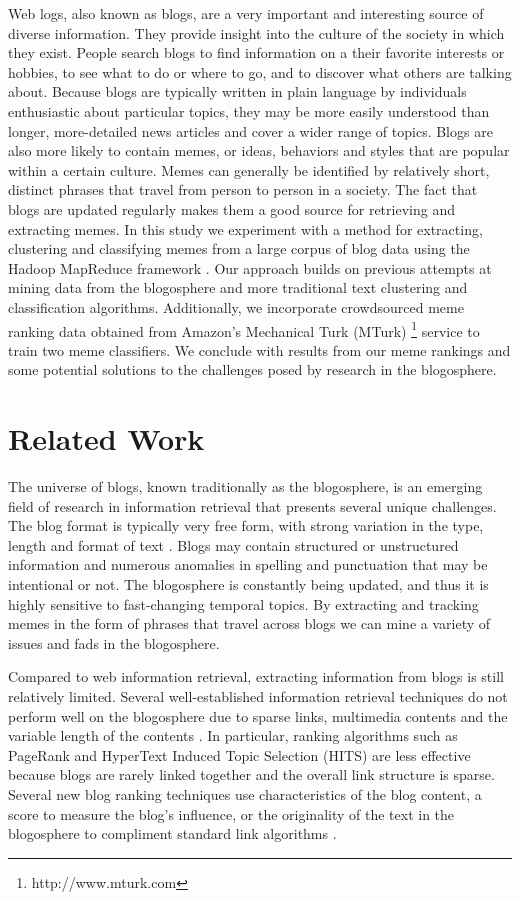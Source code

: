 \documentclass{sig-alternate}
\begin{document}
Web logs, also known as blogs, are a very important and interesting source of diverse information. They provide insight into the culture of the society in which they exist. People search blogs to find information on a their favorite interests or hobbies, to see what to do or where to go, and to discover what others are talking about. Because blogs are typically written in plain language by individuals enthusiastic about particular topics, they may be more easily understood than longer, more-detailed news articles and cover a wider range of topics. Blogs are also more likely to contain memes, or ideas, behaviors and styles that are popular within a certain culture. Memes can generally be identified by relatively short, distinct phrases that travel from person to person in a society. The fact that blogs are updated regularly makes them a good source for retrieving and extracting memes. In this study we experiment with a method for extracting, clustering and classifying memes from a large corpus of blog data using the Hadoop MapReduce framework \cite{Dean2008}. Our approach builds on previous attempts at mining data from the blogosphere and more traditional text clustering and classification algorithms. Additionally, we incorporate crowdsourced meme ranking data obtained from Amazon's Mechanical Turk (MTurk) \footnote{http://www.mturk.com} service to train two meme classifiers. We conclude with results from our meme rankings and some potential solutions to the challenges posed by research in the blogosphere.

\section{Related Work}
The universe of blogs, known traditionally as the blogosphere, is an emerging field of research in information retrieval that presents several unique challenges. The blog format is typically very free form, with strong variation in the type, length and format of text \cite{Schmidt2007}. Blogs may contain structured or unstructured information and numerous anomalies in spelling and punctuation that may be intentional or not. The blogosphere is constantly being updated, and thus it is highly sensitive to fast-changing temporal topics. By extracting and tracking memes in the form of phrases that travel across blogs we can mine a variety of issues and fads in the blogosphere.

Compared to web information retrieval, extracting information from blogs is still relatively limited. Several well-established information retrieval techniques do not perform well on the blogosphere due to sparse links, multimedia contents and the variable length of the contents \cite{Agarwal}. In particular, ranking algorithms such as PageRank \cite{Brin1998a} and HyperText Induced Topic Selection (HITS) \cite{Kleinberg1999} are less effective because blogs are rarely linked together and the overall link structure is sparse. Several new blog ranking techniques use characteristics of the blog content, a score to measure the blog's influence, or the originality of the text in the blogosphere to compliment standard link algorithms \cite{Hassan2009,Song2007}. 
\end{document}
